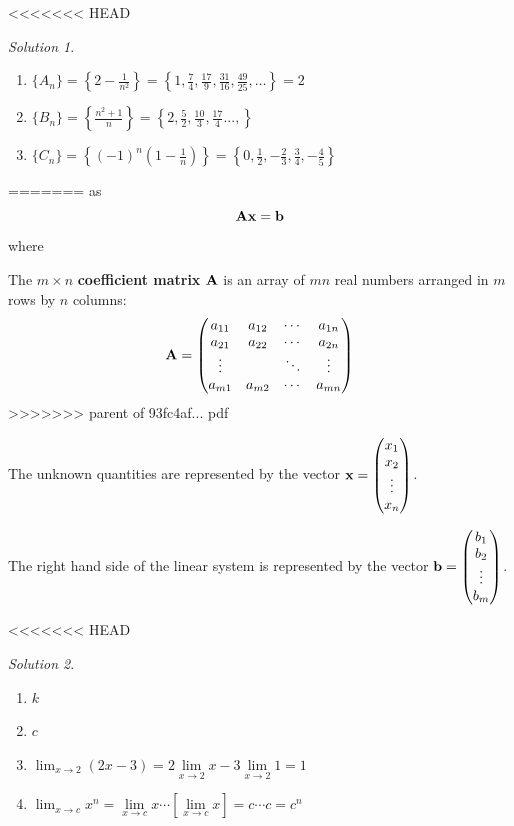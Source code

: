 \documentclass[]{book}
\providecommand{\tightlist}{%
  \setlength{\itemsep}{0pt}\setlength{\parskip}{0pt}}
\theoremstyle{definition}
\theoremstyle{definition}
\theoremstyle{definition}
\theoremstyle{remark}
\newtheorem*{solution}{Solution}
\begin{document}
<<<<<<< HEAD
\begin{solution}
{}

\begin{enumerate}
\def\labelenumi{\arabic{enumi}.}
\tightlist
\item
  \(\{A_n\}=\left\{ 2-\frac{1}{n^2} \right\} = \left\{1, \frac{7}{4}, \frac{17}{9}, \frac{31}{16}, \frac{49}{25}, \ldots\right\} = 2\)
\item
  \(\{B_n\}=\left\{\frac{n^2+1}{n} \right\} = \left\{2, \frac{5}{2}, \frac{10}{3}, \frac{17}{4}..., \right\}\)
\item
  \(\{C_n\}=\left\{(-1)^n \left(1-\frac{1}{n}\right) \right\} = \left\{0, \frac{1}{2}, -\frac{2}{3}, \frac{3}{4}, -\frac{4}{5}\right\}\)
\end{enumerate}
\end{solution}
=======
as \[{\bf A x = b}\] where

The \(m \times n\) \textbf{coefficient matrix} \({\bf A}\) is an array of \(m n\) real numbers arranged in \(m\) rows by \(n\) columns:
\[{\bf A}=\begin{pmatrix}
            a_{11} & a_{12} & \cdots & a_{1n} \\
            a_{21} & a_{22} & \cdots & a_{2n} \\
            \vdots &  & \ddots & \vdots \\
            a_{m1} & a_{m2} & \cdots & a_{mn}
            \end{pmatrix}\]
>>>>>>> parent of 93fc4af... pdf

The unknown quantities are represented by the vector \({\bf x}=\begin{pmatrix} x_1\\x_2\\\vdots\\x_n \end{pmatrix}\).

The right hand side of the linear system is represented by the vector \({\bf b}=\begin{pmatrix} b_1\\b_2\\\vdots\\b_m \end{pmatrix}\).

<<<<<<< HEAD
\begin{solution}
{}

\begin{enumerate}
\def\labelenumi{\arabic{enumi}.}
\tightlist
\item
  \(k\)
\item
  \(c\)
\item
  \(\lim_{x\to 2} (2x-3) = 2\lim\limits_{x\to 2} x - 3\lim\limits_{x\to 2} 1 = 1\)
\item
  \(\lim_{x \to c} x^n = \lim\limits_{x \to c} x \cdots[\lim\limits_{x \to c} x] = c\cdots c =c^n\)
\end{enumerate}
\end{solution}
\end{document}
